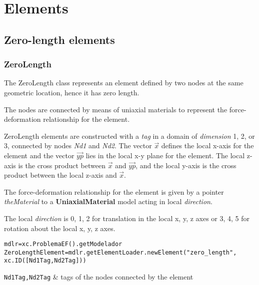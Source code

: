 \chapter{Elements}

\section{Zero-length elements}
\subsection{ZeroLength}
The ZeroLength class represents an element defined by two nodes at the same geometric location, hence it has zero length.

The nodes are connected by means of uniaxial materials to represent the force-deformation relationship for the element. 

ZeroLength elements are constructed with a {\em tag} in a domain of {\em dimension} 1, 2, or 3, connected by nodes {\em Nd1} and {\em Nd2}. 
The vector $\vec{x}$ defines the local x-axis for the element and the vector $\vec{yp}$ lies in the local x-y plane for the element.  The local z-axis is the cross product between $\vec{x}$ and $\vec{yp}$, and the local y-axis is the cross product between the local z-axis and $\vec{x}$.

The force-deformation relationship for the element is given by a pointer {\em theMaterial} to a {\bf UniaxialMaterial} model acting in local {\em direction}.

The local {\em direction} is 0, 1, 2 for translation in the local x, y, z axes or 3, 4, 5 for rotation about the local x, y, z axes. 

\begin{verbatim}
mdlr=xc.ProblemaEF().getModelador
ZeroLengthElement=mdlr.getElementLoader.newElement("zero_length",
xc.ID([Nd1Tag,Nd2Tag]))
\end{verbatim}
\begin{paramFuncTable}
{\tt Nd1Tag,Nd2Tag} & tags of the nodes connected by the element\\
\end{paramFuncTable}

\begin{paramClassTable}
\ElementParam{}
\ElementZERODParam{}
\end{paramClassTable}

\begin{methodsTable}
\ElementMeth{}
\ElementZERODMeth{}
\ZeroLengthMeth{}
\end{methodsTable}

